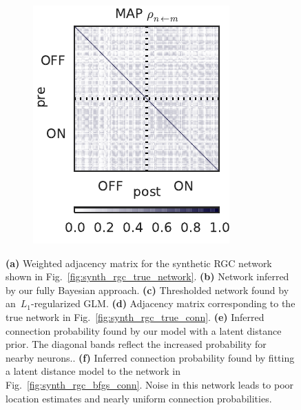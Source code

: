\begin{figure}[t!]
\begin{subfigure}[b]{1.8in}
    \includegraphics[width=\textwidth]{figures/ch5/synth_rgc_bfgs_prob_conn.pdf}
    \label{fig:synth_rgc_bfgs_prob_conn}
  \end{subfigure}
  \caption[Inferred connection probabilities for synthetic RGC data]{
    \textbf{(a)} Weighted adjacency matrix for the synthetic RGC network shown in Fig.~\ref{fig:synth_rgc_true_network}.
    \textbf{(b)} Network inferred by our fully Bayesian approach.
    \textbf{(c)} Thresholded network found by an~$L_1$-regularized GLM.
    \textbf{(d)} Adjacency matrix corresponding to the true network in Fig.~\ref{fig:synth_rgc_true_conn}.
    \textbf{(e)} Inferred connection probability found by our model with a latent distance prior. The diagonal bands reflect the increased probability for nearby neurons..
    \textbf{(f)} Inferred connection probability found by fitting a latent distance model to the network in Fig.~\ref{fig:synth_rgc_bfgs_conn}. Noise in this network leads to poor location estimates and nearly uniform connection probabilities.
  }
  \label{fig:synth_rgc_prob_conn}
\end{figure}

